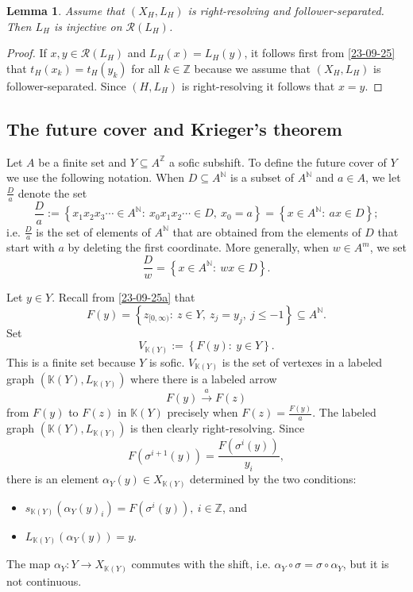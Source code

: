 \documentclass[12pt,oneside,english]{amsart}
\newtheorem{lemma}[thm]{Lemma}
\begin{document}
\begin{lemma}\label{02-09-25bx} Assume that $(X_H,L_H)$ is right-resolving and follower-separated. Then $L_H$ is injective on $\mathcal R(L_H)$.
\end{lemma}
\begin{proof} If $x,y \in \mathcal R(L_H)$ and $L_H(x) = L_H(y)$, it follows first from \eqref{23-09-25} that $t_H(x_k) = t_H(y_k)$ for all $k \in \mathbb Z$ because we assume that $(X_H,L_H)$ is follower-separated. Since $(H,L_H)$ is right-resolving it follows that $x=y$.
\end{proof}








\subsection{The future cover and Krieger's theorem} 


Let $A$ be a finite set and 
$Y \subseteq A^\mathbb Z$ a sofic subshift. To define the future cover of $Y$ we use the following notation. When $D \subseteq A^\mathbb N$ is a subset of $A^{\mathbb N}$ and $a \in A$, we let $\frac{D}{a}$ denote the set
$$
\frac{D}{a} := \left\{x_1x_2x_3 \cdots \in A^\mathbb N : \ x_0x_1x_2\cdots \in D, \ x_0 =a \right\} = \left\{x \in A^\mathbb N: \ ax \in D\right\};
$$
i.e. $\frac{D}{a}$ is the set of elements of $A^{\mathbb N}$ that are obtained from the elements of $D$ that start with $a$ by deleting the first coordinate. More generally, when $w \in A^m$, we set
$$
\frac{D}{w} = \left\{x \in A^{\mathbb N} : \ wx \in D \right\}.
$$


Let $y \in Y$. Recall from \eqref{23-09-25a} that
$$
F(y)  = \left\{ z_{[0,\infty)}: \ z \in Y, \ z_j = y_j, \ j \leq -1 \right\} \subseteq A^{\mathbb N}. 
$$
Set
$$
V_{\mathbb K(Y)} := \left\{F(y): \ y \in Y\right\} .
$$
This is a finite set because $Y$ is sofic. $V_{\mathbb K(Y)}$ is the set of vertexes in a labeled graph $(\mathbb K(Y),L_{\mathbb K(Y)})$ where there is a labeled arrow
$$
F(y) \overset{a}{\to} F(z)
$$
from $F(y)$ to $F(z)$ in $\mathbb K(Y)$ precisely when 
$F(z) = \frac{F(y)}{a}$.
The labeled graph $(\mathbb K(Y),L_{\mathbb K(Y)})$ is then clearly right-resolving. Since 
$$
F(\sigma^{i+1}(y)) = \frac{F(\sigma^{i}(y))}{y_i},
$$
there is an element $\alpha_Y(y) \in X_{\mathbb K(Y)}$ determined by the two conditions:
\begin{itemize}
\item[a)] $s_{\mathbb K(Y)}(\alpha_Y(y)_i) = F(\sigma^i(y)), \ i \in \mathbb Z$, and
\item[b)] $L_{\mathbb K(Y)}(\alpha_Y(y)) = y$.
\end{itemize}
The map $\alpha_Y : Y \to X_{\mathbb K(Y)}$ commutes with the shift, i.e. $\alpha_Y \circ \sigma = \sigma \circ \alpha_Y$, but it is not continuous.
\end{document}
